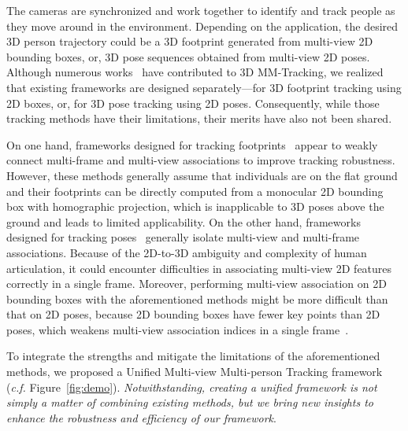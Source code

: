\documentclass{CVM}
\begin{document}
The cameras are synchronized and work together to identify and track people as they move around in the environment.
Depending on the application, the desired 3D person trajectory could be a 3D footprint generated from multi-view 2D bounding boxes, or, 3D pose sequences obtained from multi-view 2D poses. Although numerous works~\cite{black2006multi,sternig2011multi,he2020multi,chen2020multi,chen2020cross,ohashi20vmocap,dong2021fast,zhang2022voxeltrack} have contributed to 3D MM-Tracking, we realized that existing frameworks are designed separately---for 3D footprint tracking using 2D boxes, or, for 3D pose tracking using 2D poses.  Consequently, while those tracking methods have their limitations, their merits have also not been shared. 

On one hand, frameworks designed for tracking footprints~\cite{sternig2011multi,wen2017multi,kohl2020mta,he2020multi} appear to weakly connect multi-frame and multi-view associations to improve tracking robustness. However, these methods generally assume that individuals are on the flat ground and their footprints can be directly computed from a monocular 2D bounding box with homographic projection, which is inapplicable to 3D poses above the ground and leads to limited applicability. On the other hand, frameworks designed for tracking poses~\cite{chen2020multi,chen2020cross,ohashi20vmocap,dong2021fast} generally isolate multi-view and multi-frame associations. Because of the 2D-to-3D ambiguity and complexity of human articulation, it could encounter difficulties in associating multi-view 2D features correctly in a single frame. Moreover, performing multi-view association on 2D bounding boxes with the aforementioned methods might be more difficult than that on 2D poses, because 2D bounding boxes have fewer key points than 2D poses, which weakens multi-view association indices in a single frame~\cite{canton2005towards}. 



To integrate the strengths and mitigate the limitations of the aforementioned methods, we proposed a Unified Multi-view Multi-person Tracking framework (\textit{c.f.} Figure~\ref{fig:demo}). \textit{Notwithstanding, creating a unified framework is not simply a matter of combining existing methods, but we bring new insights to enhance the robustness and efficiency of our framework}.
\end{document}
